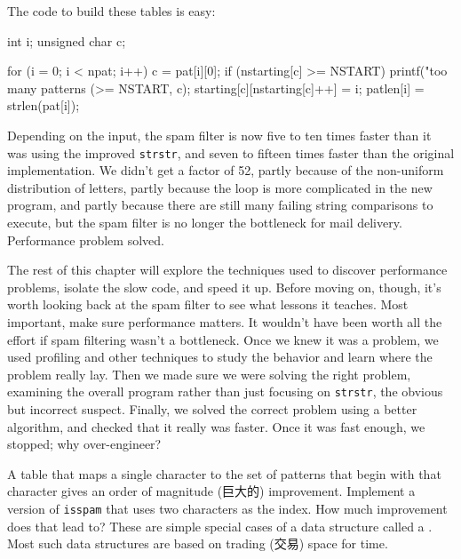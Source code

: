 \begin{figure}[h]
\begin{varwidth}[t]{\textwidth}
\end{varwidth}

\end{figure}

The code to build these tables is easy:
\begin{wellcode}
    int i;
    unsigned char c;

    for (i = 0; i < npat; i++) {
        c = pat[i][0];
        if (nstarting[c] >= NSTART)
            printf("too many patterns (>=%
                    NSTART, c);
        starting[c][nstarting[c]++] = i;
        patlen[i] = strlen(pat[i]);
    }
\end{wellcode}

Depending on the input, the spam filter is now five to ten times faster
than it was using the improved \verb'strstr', and seven to fifteen times
faster than the original implementation. We didn't get a factor of 52,
partly because of the non-uniform distribution of letters, partly because
the loop is more complicated in the new program, and partly because there
are still many failing string comparisons to execute, but the spam filter
is no longer the bottleneck for mail delivery. Performance problem solved.

The rest of this chapter will explore the techniques used to discover
performance problems, isolate the slow code, and speed it up. Before moving
on, though, it's worth looking back at the spam filter to see what lessons
it teaches. Most important, make sure performance matters. It wouldn't have
been worth all the effort if spam filtering wasn't a bottleneck. Once we
knew it was a problem, we used profiling and other techniques to study the
behavior and learn where the problem really lay. Then we made sure we were
solving the right problem, examining the overall program rather than just
focusing on \verb'strstr', the obvious but incorrect suspect. Finally, we
solved the correct problem using a better algorithm, and checked that it
really was faster. Once it was fast enough, we stopped; why over-engineer?

\begin{exercise}
    A table that maps a single character to the set of patterns that begin
    with that character gives an order of magnitude (巨大的) improvement.
    Implement a version of \verb'isspam' that uses two characters as the
    index. How much improvement does that lead to? These are simple special
    cases of a data structure called a . Most such data
    structures are based on trading (交易) space for time.
\end{exercise}

